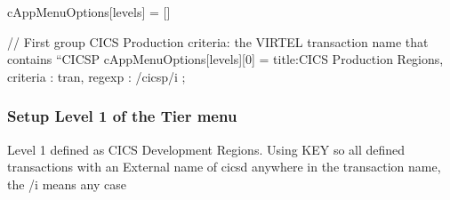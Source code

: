 \documentclass[letterpaper,10pt,english]{sphinxmanual}
\begin{document}
\sphinxAtStartPar
{}

\begin{sphinxVerbatim}[commandchars=\\\{\}]
cAppMenuOptions[\PYGZdq{}levels\PYGZdq{}] = []

// First group \PYGZhy{} CICS Production \PYGZhy{} criteria: the VIRTEL transaction name that contains “CICSP\PYGZdq{}
cAppMenuOptions[\PYGZdq{}levels\PYGZdq{}][0] =  \PYGZob{}
        \PYGZdq{}title\PYGZdq{}:\PYGZdq{}CICS Production Regions\PYGZdq{},
        \PYGZdq{}criteria\PYGZdq{} : \PYGZdq{}tran\PYGZdq{},
        \PYGZdq{}regexp\PYGZdq{} : /cicsp/i
            \PYGZcb{};
\end{sphinxVerbatim}


\subsubsection{Setup Level 1 of the Tier menu \sphinxhyphen{} }
\label{\detokenize{Customization:setup-level-1-of-the-tier-menu-cics-development-regions}}
\sphinxAtStartPar
Level  1 defined as CICS Development Regions.  Using KEY  so all defined transactions with an External name of cicsd anywhere in the transaction name, the /i means any case

\sphinxAtStartPar
{}

\begin{sphinxVerbatim}[commandchars=\\\{\}]
                
\PYG{p}{[}\PYG{p}{]}\PYG{p}{[}\PYG{p}{]}   
          
          
\end{sphinxVerbatim}
\end{document}
